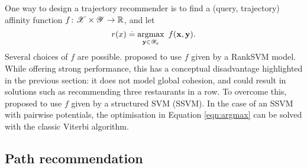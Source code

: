 One way to design a trajectory recommender is to find a (query, trajectory) affinity function $f \colon \mathscr{X} \times \mathscr{Y} \to \mathbb{R}$, and let
\begin{equation}
	\label{eqn:argmax}
	r( x ) \stackrel{.}{=} \operatorname*{argmax}_{\mathbf{y} \in \mathscr{Y}_x}~f(\mathbf{x}, \mathbf{y}).
\end{equation}
Several choices of $f$ are possible.
\citet{cikm16paper} proposed to use $f$ given by a RankSVM model. %
While offering strong performance, this has a conceptual disadvantage highlighted in the previous section:
it does not model global cohesion, and could result in solutions such as recommending three restaurants in a row.
To overcome this, \citet{Chen:2017} proposed to use $f$ given by a structured SVM (SSVM).
In the case of an SSVM with pairwise potentials, the optimisation in Equation \ref{eqn:argmax} can be solved with the classic Viterbi algorithm.



%
\subsection{Path recommendation}

